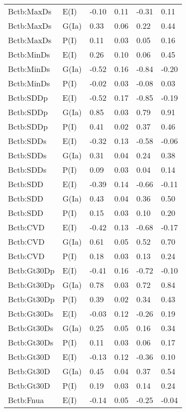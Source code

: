 \begin{center}
\begin{longtable}{|p{1.1in}|p{0.7in}|p{0.7in}|p{0.6in}|p{0.6in}|p{0.6in}|}
  Bctb:MaxDs & E(I) & -0.10 & 0.11 & -0.31 & 0.11 \\ 
  Bctb:MaxDs & G(Ia) & 0.33 & 0.06 & 0.22 & 0.44 \\ 
  Bctb:MaxDs & P(I) & 0.11 & 0.03 & 0.05 & 0.16 \\ 
  Bctb:MinDs & E(I) & 0.26 & 0.10 & 0.06 & 0.45 \\ 
  Bctb:MinDs & G(Ia) & -0.52 & 0.16 & -0.84 & -0.20 \\ 
  Bctb:MinDs & P(I) & -0.02 & 0.03 & -0.08 & 0.03 \\ 
  Bctb:SDDp & E(I) & -0.52 & 0.17 & -0.85 & -0.19 \\ 
  Bctb:SDDp & G(Ia) & 0.85 & 0.03 & 0.79 & 0.91 \\ 
  Bctb:SDDp & P(I) & 0.41 & 0.02 & 0.37 & 0.46 \\ 
  Bctb:SDDs & E(I) & -0.32 & 0.13 & -0.58 & -0.06 \\ 
  Bctb:SDDs & G(Ia) & 0.31 & 0.04 & 0.24 & 0.38 \\ 
  Bctb:SDDs & P(I) & 0.09 & 0.03 & 0.04 & 0.14 \\ 
  Bctb:SDD & E(I) & -0.39 & 0.14 & -0.66 & -0.11 \\ 
  Bctb:SDD & G(Ia) & 0.43 & 0.04 & 0.36 & 0.50 \\ 
  Bctb:SDD & P(I) & 0.15 & 0.03 & 0.10 & 0.20 \\ 
  Bctb:CVD & E(I) & -0.42 & 0.13 & -0.68 & -0.17 \\ 
  Bctb:CVD & G(Ia) & 0.61 & 0.05 & 0.52 & 0.70 \\ 
  Bctb:CVD & P(I) & 0.18 & 0.03 & 0.13 & 0.24 \\ 
  Bctb:Gt30Dp & E(I) & -0.41 & 0.16 & -0.72 & -0.10 \\ 
  Bctb:Gt30Dp & G(Ia) & 0.78 & 0.03 & 0.72 & 0.84 \\ 
  Bctb:Gt30Dp & P(I) & 0.39 & 0.02 & 0.34 & 0.43 \\ 
  Bctb:Gt30Ds & E(I) & -0.03 & 0.12 & -0.26 & 0.19 \\ 
  Bctb:Gt30Ds & G(Ia) & 0.25 & 0.05 & 0.16 & 0.34 \\ 
  Bctb:Gt30Ds & P(I) & 0.11 & 0.03 & 0.06 & 0.17 \\ 
  Bctb:Gt30D & E(I) & -0.13 & 0.12 & -0.36 & 0.10 \\ 
  Bctb:Gt30D & G(Ia) & 0.45 & 0.04 & 0.37 & 0.54 \\ 
  Bctb:Gt30D & P(I) & 0.19 & 0.03 & 0.14 & 0.24 \\ 
  Bctb:Fnua & E(I) & -0.14 & 0.05 & -0.25 & -0.04 \\ 

\end{longtable}
\end{center}
